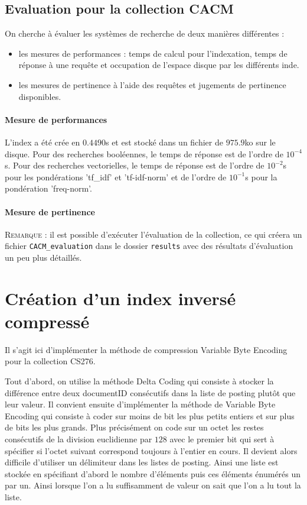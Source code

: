 \documentclass[12pt,a4paper]{article}
\begin{document}
\subsection{Evaluation pour la collection CACM}

On cherche à évaluer les systèmes de recherche de deux manières différentes :
\begin{itemize}
\item les mesures de performances : temps de calcul pour l’indexation, temps de réponse à une requête et occupation de l’espace disque par les différents inde.
\item les mesures de pertinence à l'aide des requêtes et jugements de pertinence disponibles.
\end{itemize}

\paragraph{Mesure de performances} L'index a été crée en $0.4490$s et est stocké dans un fichier de $975.9$ko sur le disque.
Pour des recherches booléennes, le temps de réponse est de l'ordre de $10^{-4}$s.
Pour des recherches vectorielles, le temps de réponse est de l'ordre de $10^{-2}$s pour les pondérations 'tf_idf' et 'tf-idf-norm' et de l'ordre de $10^{-1}$s pour la pondération 'freq-norm'.

\paragraph{Mesure de pertinence}

\noindent \textsc{Remarque} : il est possible d'exécuter l'évaluation de la collection, ce qui créera un fichier \texttt{CACM\_evaluation} dans le dossier \texttt{results} avec des résultats d'évaluation un peu plus détaillés.

\section{Création d’un index inversé compressé}
Il s'agit ici d'implémenter la méthode de compression Variable Byte Encoding pour la collection CS276.

Tout d'abord, on utilise la méthode Delta Coding qui consiste à stocker la différence entre deux documentID consécutifs dans la liste de posting plutôt que leur valeur. Il convient ensuite d'implémenter la méthode de Variable Byte Encoding qui consiste à coder sur moins de bit les plus petits entiers et sur plus de bits les plus grands. Plus précisément on code sur un octet les restes consécutifs de la division euclidienne par $128$ avec le premier bit qui sert à spécifier si l'octet suivant correspond toujours à l'entier en cours. Il devient alors difficile d'utiliser un délimiteur dans les listes de posting. Ainsi une liste est stockée en spécifiant d'abord le nombre d'éléments puis ces éléments énumérés un par un. Ainsi lorsque l'on a lu suffisamment de valeur on sait que l'on a lu tout la liste.
\end{document}

